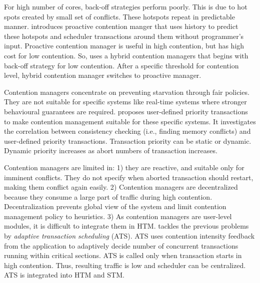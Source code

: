 \documentclass[12pt,english]{report}
\begin{document}
For high number of cores, back-off strategies perform poorly. This
is due to hot spots created by small set of conflicts. These hotspots
repeat in predictable manner. \cite{Blake:2009:PTS:1669112.1669133}
introduces proactive contention manger that uses history to predict
these hotspots and scheduler transactions around them without programmer's
input. Proactive contention manager is useful in high contention,
but has high cost for low contention. So, \cite{Blake:2009:PTS:1669112.1669133}
uses a hybrid contention managers that begins with back-off strategy
for low contention. After a specific threshold for contention level,
hybrid contention manager switches to proactive manager.

Contention managers concentrate on preventing starvation through fair
policies. They are not suitable for specific systems like real-time
systems where stronger behavioural guarantees are required. \cite{gottschlich2008extending}
proposes user-defined priority transactions to make contention management
suitable for these specific systems. It investigates the correlation
between consistency checking (i.e., finding memory conflicts) and
user-defined priority transactions. Transaction priority can be static
or dynamic. Dynamic priority increases as abort numbers of transaction
increases.

Contention managers are limited in: 1) they are reactive, and suitable
only for imminent conflicts. They do not specify when aborted transaction
should restart, making them conflict again easily. 2) Contention managers
are decentralized because they consume a large part of traffic during
high contention. Decentralization prevents global view of the system
and limit contention management policy to heuristics. 3) As contention
managers are user-level modules, it is difficult to integrate them
in HTM. \cite{Scherer:2005:ACM:1073814.1073861} tackles the previous
problems by \textit{adaptive transaction scheduling} (ATS). ATS uses
contention intensity feedback from the application to adaptively decide
number of concurrent transactions running within critical sections.
ATS is called only when transaction starts in high contention. Thus,
resulting traffic is low and scheduler can be centralized. ATS is
integrated into HTM and STM.
\end{document}
